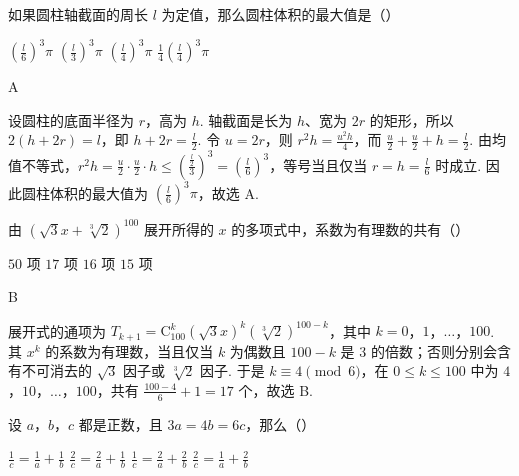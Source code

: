 \documentclass[UTF8,a4paper,oneside,11pt]{ctexbook}
\begin{document}
\begin{problem}
如果圆柱轴截面的周长 \(l\) 为定值，那么圆柱体积的最大值是（\quad）

\choices
    {\(\left(\frac{l}{6}\right)^3\pi\)}
    {\(\left(\frac{l}{3}\right)^3\pi\)}
    {\(\left(\frac{l}{4}\right)^3\pi\)}
    {\(\frac{1}{4}\left(\frac{l}{4}\right)^3\pi\)}
\end{problem}

\begin{answer}
A
\end{answer}

\begin{solution}
设圆柱的底面半径为 \(r\)，高为 \(h\). 轴截面是长为 \(h\)、宽为 \(2r\) 的矩形，所以 \(2(h+2r)=l\)，即 \(h+2r=\frac{l}{2}\). 令 \(u=2r\)，则 \(r^2h=\frac{u^2h}{4}\)，而 \(\frac{u}{2}+\frac{u}{2}+h=\frac{l}{2}\). 由均值不等式，\(\displaystyle r^2h=\frac{u}{2}\cdot\frac{u}{2}\cdot h\leqslant\left(\frac{\frac{l}{2}}{3}\right)^3=\left(\frac{l}{6}\right)^3\)，等号当且仅当 \(r=h=\frac{l}{6}\) 时成立. 因此圆柱体积的最大值为 \(\left(\frac{l}{6}\right)^3\pi\)，故选 A.
\end{solution}

\begin{problem}
由 \((\sqrt{3} x + \sqrt[3]{2})^{100}\) 展开所得的 \(x\) 的多项式中，系数为有理数的共有（\quad）

\choices
    {\(50\) 项}
    {\(17\) 项}
    {\(16\) 项}
    {\(15\) 项}
\end{problem}

\begin{answer}
B
\end{answer}

\begin{solution}
展开式的通项为 \(T_{k+1}=\mathrm C_{100}^{k}(\sqrt{3}x)^k(\sqrt[3]{2})^{100-k}\)，其中 \(k=0\)，\(1\)，\(\ldots\)，\(100\). 其 \(x^k\) 的系数为有理数，当且仅当 \(k\) 为偶数且 \(100-k\) 是 \(3\) 的倍数；否则分别会含有不可消去的 \(\sqrt{3}\) 因子或 \(\sqrt[3]{2}\) 因子. 于是 \(k\equiv4\pmod{6}\)，在 \(0\leqslant k\leqslant100\) 中为 \(4\)，\(10\)，\(\ldots\)，\(100\)，共有 \(\frac{100-4}{6}+1=17\) 个，故选 B.
\end{solution}

\begin{problem}
设 \(a\)，\(b\)，\(c\) 都是正数，且 \(3a = 4b = 6c\)，那么（\quad）

\choices
    {\(\frac{1}{c} = \frac{1}{a} + \frac{1}{b}\)}
    {\(\frac{2}{c} = \frac{2}{a} + \frac{1}{b}\)}
    {\(\frac{1}{c} = \frac{2}{a} + \frac{2}{b}\)}
    {\(\frac{2}{c} = \frac{1}{a} + \frac{2}{b}\)}
\end{problem}
\end{document}
